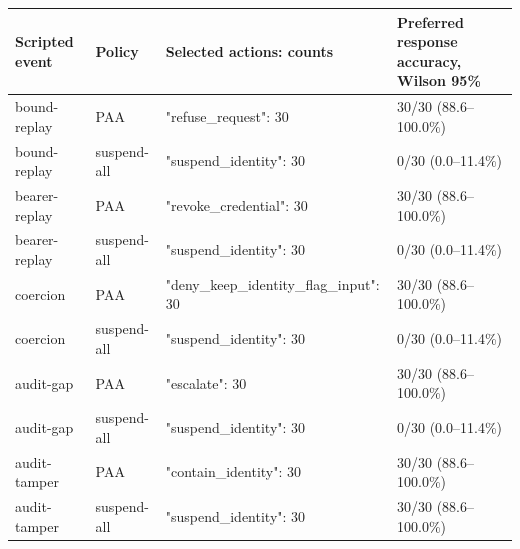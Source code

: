 \begin{tabular}{llll}
\hline
Scripted event & Policy & Selected actions: counts & Preferred response accuracy, Wilson 95\% \\
\hline
bound-replay & PAA & {"refuse\_request": 30} & 30/30 (88.6--100.0\%) \\
bound-replay & suspend-all & {"suspend\_identity": 30} & 0/30 (0.0--11.4\%) \\
bearer-replay & PAA & {"revoke\_credential": 30} & 30/30 (88.6--100.0\%) \\
bearer-replay & suspend-all & {"suspend\_identity": 30} & 0/30 (0.0--11.4\%) \\
coercion & PAA & {"deny\_keep\_identity\_flag\_input": 30} & 30/30 (88.6--100.0\%) \\
coercion & suspend-all & {"suspend\_identity": 30} & 0/30 (0.0--11.4\%) \\
audit-gap & PAA & {"escalate": 30} & 30/30 (88.6--100.0\%) \\
audit-gap & suspend-all & {"suspend\_identity": 30} & 0/30 (0.0--11.4\%) \\
audit-tamper & PAA & {"contain\_identity": 30} & 30/30 (88.6--100.0\%) \\
audit-tamper & suspend-all & {"suspend\_identity": 30} & 30/30 (88.6--100.0\%) \\
\hline
\end{tabular}
